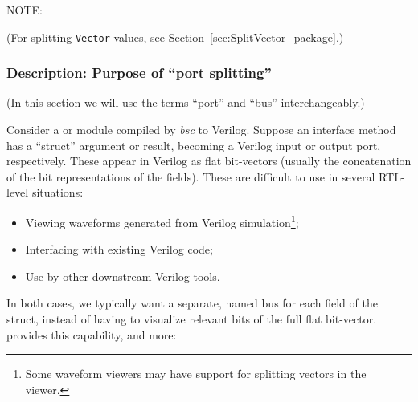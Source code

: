 
NOTE: \hfill {}

{\footnotesize (For splitting {\tt Vector} values, see
  Section~\ref{sec:SplitVector_package}.)}


\subsubsection{Description: Purpose of ``port splitting''}


{\footnotesize (In this section we will use the terms ``port'' and ``bus'' interchangeably.)}

Consider a {\BHb} or {\BSVb} module compiled by \emph{bsc} to
Verilog. Suppose an interface method has a ``struct'' argument or
result, becoming a Verilog input or output port, respectively.  These
appear in Verilog as flat bit-vectors (usually the concatenation of
the bit representations of the fields).  These are difficult to use in
several RTL-level situations:

\begin{itemize}

  \item Viewing waveforms generated from Verilog
    simulation\footnote{Some waveform viewers may have support for
    splitting vectors in the viewer.};

  \item Interfacing with existing Verilog code;
  \item Use by other downstream Verilog tools.
\end{itemize}

In both cases, we typically want a separate, named bus for each field
of the struct, instead of having to visualize relevant bits of the
full flat bit-vector.   provides this capability, and
more:

